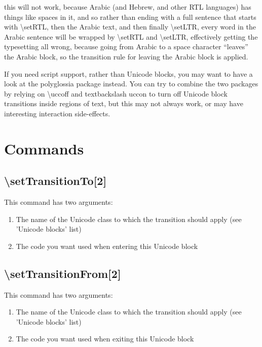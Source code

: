 ﻿\documentclass{article}
\newenvironment{numberlist}{%
  \begin{enumerate}
	\setlength{\itemsep}{0pt}
	\setlength{\parsep}{0pt}
	\setlength{\topsep}{0pt}
	\setlength{\partopsep}{0pt}
	\setlength{\parskip}{0pt}
	\setlength{\labelsep}{5pt}}%
{
  \end{enumerate}}
\begin{document}
		this will not work, because Arabic (and Hebrew, and other RTL languages) has things like spaces in it, and so rather than ending with a full sentence that starts with \textbackslash setRTL, then the Arabic text, and then finally \textbackslash setLTR, every word in the Arabic sentence will be wrapped by \textbackslash setRTL and \textbackslash setLTR, effectively getting the typesetting all wrong, because going from Arabic to a space character “leaves” the Arabic block, so the transition rule for leaving the Arabic block is applied.

		If you need script support, rather than Unicode blocks, you may want to have a look at the polyglossia package instead. You can try to combine the two packages by relying on \textbackslash uccoff and textbackslash uccon to turn off Unicode block transitions inside regions of text, but this may not always work, or may have interesting interaction side-effects.

	\section{Commands}
		
		\subsection{\textbackslash setTransitionTo[2]}

			This command has two arguments:
			
			\begin{numberlist}
				\item The name of the Unicode class to which the transition should apply (see 'Unicode blocks' list)
				\item The code you want used when entering this Unicode block
			\end{numberlist}

		\subsection{\textbackslash setTransitionFrom[2]}

			This command has two arguments:
			
			\begin{numberlist}
				\item The name of the Unicode class to which the transition should apply (see 'Unicode blocks' list)
				\item The code you want used when exiting this Unicode block
			\end{numberlist}
		
\end{document}
